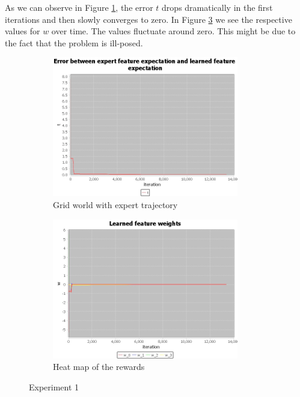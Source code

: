 \documentclass[10pt,a4paper,twocolumn]{article}
\begin{document}
As we can observe in Figure \ref{fig:experiment1t}, the error $t$ drops dramatically in the first iterations and then slowly converges to zero. In Figure \ref{fig:experiment1w} we see the respective values for $w$ over time. The values fluctuate around zero. This might be due to the fact that the problem is ill-posed.

\begin{figure}[h]
\begin{subfigure}[b]{0.5\textwidth}
	\includegraphics[width=\textwidth]{experiment_1_t}
	\caption{Grid world with expert trajectory}
	\label{fig:experiment1t}
\end{subfigure}
\begin{subfigure}[b]{0.5\textwidth}
	\includegraphics[width=\textwidth]{experiment_1_w}
	\caption{Heat map of the rewards}
	\label{fig:experiment1w}
\end{subfigure}
\caption{Experiment 1}
\end{figure}
\end{document}
